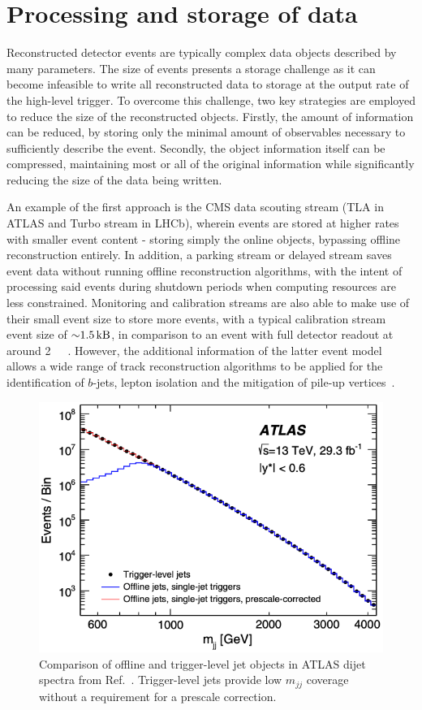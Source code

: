 \section{Processing and storage of data}
\label{sec:data}

Reconstructed detector events are typically complex data objects described by many parameters. The size of events presents a storage challenge as it can become infeasible to write all reconstructed data to storage at the output rate of the high-level trigger. To overcome this challenge, two key strategies are employed to reduce the size of the reconstructed objects. Firstly, the amount of information can be reduced, by storing only the minimal amount of observables necessary to sufficiently describe the event. Secondly, the object information itself can be compressed, maintaining most or all of the original information while significantly reducing the size of the data being written.

An example of the first approach is the CMS data scouting stream (TLA in ATLAS and Turbo stream in LHCb), wherein events are stored at higher rates with smaller event content - storing simply the online objects, bypassing offline reconstruction entirely. In addition, a parking stream or delayed stream saves event data without running offline reconstruction algorithms, with the intent of processing said events during shutdown periods when computing resources are less constrained. Monitoring and calibration streams are also able to make use of their small event size to store more events, with a typical calibration stream event size of ${\sim}\SI{1.5}{\kilo\byte}$, in comparison to an event with full detector readout at around \SI{2}{\mega\byte}~\cite{cms2023development}. However, the additional information of the latter event model allows a wide range of track reconstruction algorithms to be applied for the identification of $b$-jets, lepton isolation and the mitigation of pile-up vertices~\cite{mia2014trackingcms,tosi2016trackingcms}. 

\begin{figure}[h!]
    \centering
    \includegraphics[width=0.55\linewidth]{images/atlas/ATLAS-TLA.png}
    \caption{Comparison of offline and trigger-level jet objects in ATLAS dijet spectra from Ref.~\cite{ATLAS:2018qto}. Trigger-level jets provide low $m_{jj}$ coverage without a requirement for a prescale correction.}
    \label{fig:trigger-level-efficiencies}
\end{figure}

